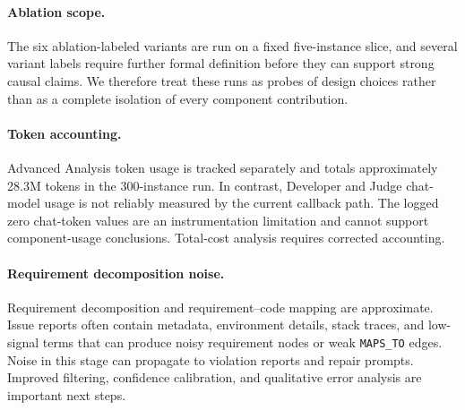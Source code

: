 \documentclass[11pt]{article}
\begin{document}
\paragraph{Ablation scope.}
The six ablation-labeled variants are run on a fixed five-instance slice, and several variant labels require further formal definition before they can support strong causal claims.  We therefore treat these runs as probes of design choices rather than as a complete isolation of every component contribution.

\paragraph{Token accounting.}
Advanced Analysis token usage is tracked separately and totals approximately 28.3M tokens in the 300-instance run.  In contrast, Developer and Judge chat-model usage is not reliably measured by the current callback path.  The logged zero chat-token values are an instrumentation limitation and cannot support component-usage conclusions.  Total-cost analysis requires corrected accounting.

\paragraph{Requirement decomposition noise.}
Requirement decomposition and requirement--code mapping are approximate.  Issue reports often contain metadata, environment details, stack traces, and low-signal terms that can produce noisy requirement nodes or weak \texttt{MAPS\_TO} edges.  Noise in this stage can propagate to violation reports and repair prompts.  Improved filtering, confidence calibration, and qualitative error analysis are important next steps.



\end{document}
